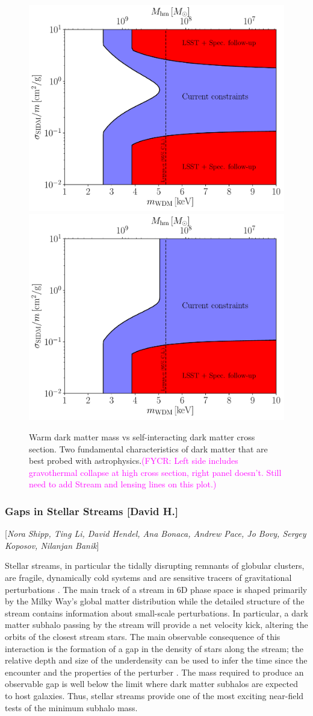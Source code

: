 \documentclass[modern,linenumbers]{aastex62}
\newcommand{\Contributors}[1]{ {\footnotesize [\textit{#1}]}}
\newcommand{\Contact}[1]{ {\footnotesize [\textbf{#1}]}}
\newcommand{\Comment}[3]{\textcolor{#1}{(#2: #3)}}
\newcommand{\FYCR}[1]{\Comment{magenta}{FYCR}{#1}} %
\begin{document}
\begin{figure}
\centering
\includegraphics[width=0.49\columnwidth]{figures/SIDM_WDM_figw_coll.pdf}
\includegraphics[width=0.49\columnwidth]{figures/SIDM_WDM_fig_wo_coll.pdf}
\caption{\label{fig:sidm_wdm} Warm dark matter mass vs self-interacting dark matter cross section. Two fundamental characteristics of dark matter that are best probed with astrophysics.\FYCR{Left side includes gravothermal collapse at high cross section, right panel doesn't. Still need to add Stream and lensing lines on this plot.}}
\end{figure}


\subsubsection{Gaps in Stellar Streams \Contact{David H.}}
\Contributors{Nora Shipp, Ting Li, David Hendel, Ana Bonaca, Andrew Pace, Jo Bovy, Sergey Koposov, Nilanjan Banik}
\label{sec:stream_gaps}


Stellar streams, in particular the tidally disrupting remnants of globular clusters, are fragile, dynamically cold systems and are sensitive tracers of gravitational perturbations \citep[][]{Carlberg:2012}.
The main track of a stream in 6D phase space is shaped primarily by the Milky Way's global matter distribution while the detailed structure of the stream contains information about small-scale perturbations. 
In particular, a dark matter subhalo passing by the stream will provide a net velocity kick, altering the orbits of the closest stream stars.
The main observable consequence of this interaction is the formation of a gap in the density of stars along the stream; the relative depth and size of the underdensity can be used to infer the time since the encounter and the properties of the perturber \citep{Carlberg:2012, Erkal:2015}. The mass required to produce an observable gap \citep[$10^5-10^6 M_\odot$,][]{erkal2016,bovy:2017} is well below the limit where dark matter subhalos are expected to host galaxies. Thus, stellar streams provide one of the most exciting near-field tests of the minimum subhalo mass.
\end{document}
